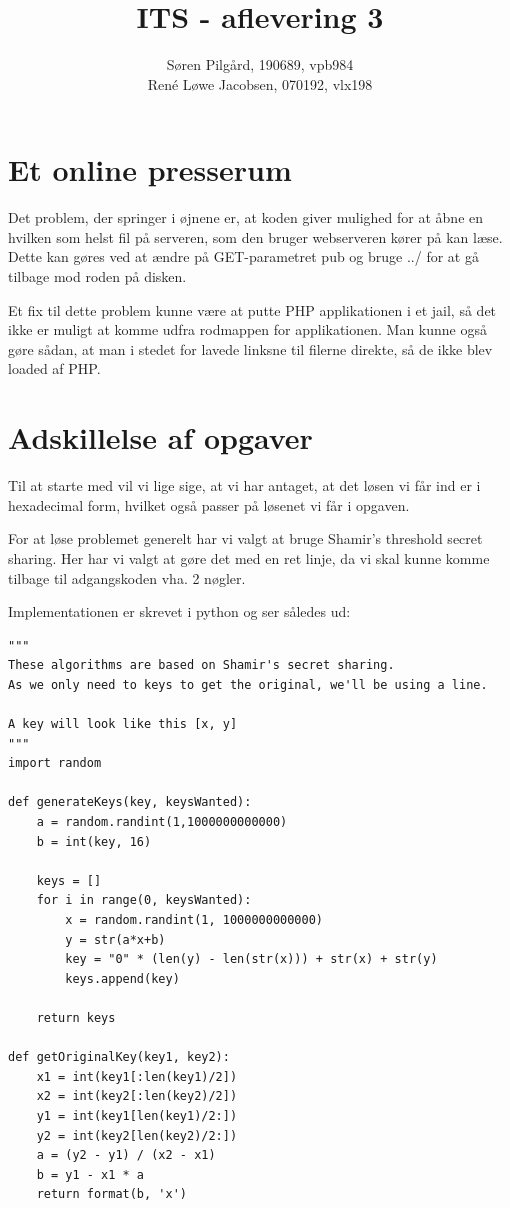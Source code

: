 \documentclass[10pt,a4paper,danish]{article}
\title{ITS - aflevering 3}
\author{Søren Pilgård, 190689, vpb984\\
  René Løwe Jacobsen, 070192, vlx198}
\begin{document}
\maketitle
\newpage

\tableofcontents
\newpage

\section{Et online presserum}
Det problem, der springer i øjnene er, at koden giver mulighed for at åbne en
hvilken som helst fil på serveren, som den bruger webserveren kører på kan læse.
Dette kan gøres ved at ændre på GET-parametret pub og bruge ../ for at gå tilbage
mod roden på disken.

Et fix til dette problem kunne være at putte PHP applikationen i et jail, så det
ikke er muligt at komme udfra rodmappen for applikationen.
Man kunne også gøre sådan, at man i stedet for lavede linksne til filerne
direkte, så de ikke blev loaded af PHP.

\section{Adskillelse af opgaver}
Til at starte med vil vi lige sige, at vi har antaget, at det løsen vi får
ind er i hexadecimal form, hvilket også passer på løsenet vi får i opgaven.

For at løse problemet generelt har vi valgt at bruge Shamir's threshold secret
sharing. Her har vi valgt at gøre det med en ret linje, da vi skal kunne komme
tilbage til adgangskoden vha. 2 nøgler.

Implementationen er skrevet i python og ser således ud:
\begin{verbatim}
"""
These algorithms are based on Shamir's secret sharing.
As we only need to keys to get the original, we'll be using a line.

A key will look like this [x, y]
"""
import random

def generateKeys(key, keysWanted):
    a = random.randint(1,1000000000000)
    b = int(key, 16)

    keys = []
    for i in range(0, keysWanted):
        x = random.randint(1, 1000000000000)
        y = str(a*x+b)
        key = "0" * (len(y) - len(str(x))) + str(x) + str(y)
        keys.append(key)

    return keys

def getOriginalKey(key1, key2):
    x1 = int(key1[:len(key1)/2])
    x2 = int(key2[:len(key2)/2])
    y1 = int(key1[len(key1)/2:])
    y2 = int(key2[len(key2)/2:])
    a = (y2 - y1) / (x2 - x1)
    b = y1 - x1 * a
    return format(b, 'x')
\end{verbatim}
\end{document}
